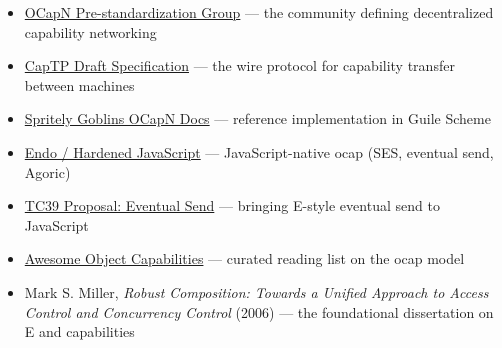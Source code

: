 \documentclass[11pt]{article}
\begin{document}
\begin{itemize}
\item \href{https://ocapn.org/}{OCapN Pre-standardization Group} --- the community defining decentralized capability networking
\item \href{https://github.com/ocapn/ocapn/blob/main/draft-specifications/CapTP\%20Specification.md}{CapTP Draft Specification} --- the wire protocol for capability transfer between machines
\item \href{https://spritely.institute/files/docs/guile-goblins/0.10/OCapN-The-Object-Capabilities-Network.html}{Spritely Goblins OCapN Docs} --- reference implementation in Guile Scheme
\item \href{https://github.com/endojs/endo}{Endo / Hardened JavaScript} --- JavaScript-native ocap (SES, eventual send, Agoric)
\item \href{https://github.com/tc39/proposal-eventual-send}{TC39 Proposal: Eventual Send} --- bringing E-style eventual send to JavaScript
\item \href{https://github.com/dckc/awesome-ocap}{Awesome Object Capabilities} --- curated reading list on the ocap model
\item Mark S. Miller, \emph{Robust Composition: Towards a Unified Approach to Access Control and Concurrency Control} (2006) --- the foundational dissertation on E and capabilities
\end{itemize}
\end{document}
